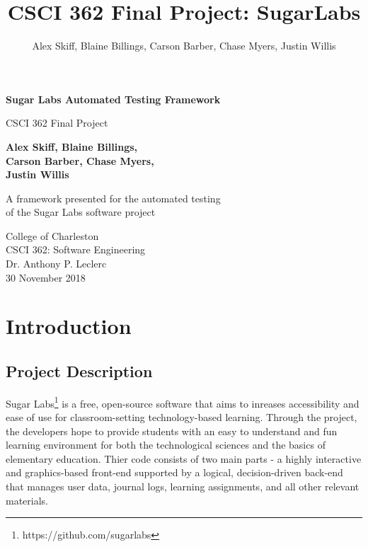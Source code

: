 \documentclass{article}
\title{CSCI 362 Final Project: SugarLabs}
\author{Alex Skiff, Blaine Billings, Carson Barber, Chase Myers, Justin Willis}
\date{ }
\begin{document}
\begin{titlepage}
    \begin{center}
        \vspace*{1cm}
 
        \Huge
        \textbf{Sugar Labs Automated Testing Framework}
 
        \vspace{0.5cm}
        \LARGE
        CSCI 362 Final Project
 
        \vspace{1.5cm}
 
        \textbf{Alex Skiff, Blaine Billings,}\\
        \textbf{Carson Barber, Chase Myers,}\\
        \textbf{Justin Willis}
 
        \vfill
 
        A framework presented for the automated testing\\
        of the Sugar Labs software project
 
        \vspace{0.8cm}
 

        \Large
        College of Charleston\\
        CSCI 362: Software Engineering\\
        Dr. Anthony P. Leclerc\\
        30 November 2018
 
    \end{center}
\end{titlepage}
 
\tableofcontents

\newpage

\section{Introduction}
\subsection{Project Description}
Sugar Labs\footnote{https://github.com/sugarlabs} is a free, open-source software that aims to inreases accessibility and ease of use for classroom-setting technology-based learning. Through the project, the developers hope to provide students with an easy to understand and fun learning environment for both the technological sciences and the basics of elementary education. Thier code consists of two main parts - a highly interactive and graphics-based front-end supported by a logical, decision-driven back-end that manages user data, journal logs, learning assignments, and all other relevant materials.
\end{document}
